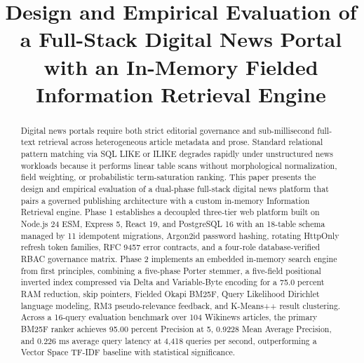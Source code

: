 \documentclass[conference]{IEEEtran}
\begin{document}
\title{Design and Empirical Evaluation of a Full-Stack Digital News Portal with an In-Memory Fielded Information Retrieval Engine}

\author{
}

\maketitle

\begin{abstract}
Digital news portals require both strict editorial governance and sub-millisecond full-text retrieval across heterogeneous article metadata and prose. Standard relational pattern matching via SQL LIKE or ILIKE degrades rapidly under unstructured news workloads because it performs linear table scans without morphological normalization, field weighting, or probabilistic term-saturation ranking. This paper presents the design and empirical evaluation of a dual-phase full-stack digital news platform that pairs a governed publishing architecture with a custom in-memory Information Retrieval engine. Phase 1 establishes a decoupled three-tier web platform built on Node.js 24 ESM, Express 5, React 19, and PostgreSQL 16 with an 18-table schema managed by 11 idempotent migrations, Argon2id password hashing, rotating HttpOnly refresh token families, RFC 9457 error contracts, and a four-role database-verified RBAC governance matrix. Phase 2 implements an embedded in-memory search engine from first principles, combining a five-phase Porter stemmer, a five-field positional inverted index compressed via Delta and Variable-Byte encoding for a 75.0 percent RAM reduction, skip pointers, Fielded Okapi BM25F, Query Likelihood Dirichlet language modeling, RM3 pseudo-relevance feedback, and K-Means++ result clustering. Across a 16-query evaluation benchmark over 104 Wikinews articles, the primary BM25F ranker achieves 95.00 percent Precision at 5, 0.9228 Mean Average Precision, and 0.226 ms average query latency at 4,418 queries per second, outperforming a Vector Space TF-IDF baseline with statistical significance.
\end{abstract}
\end{document}
